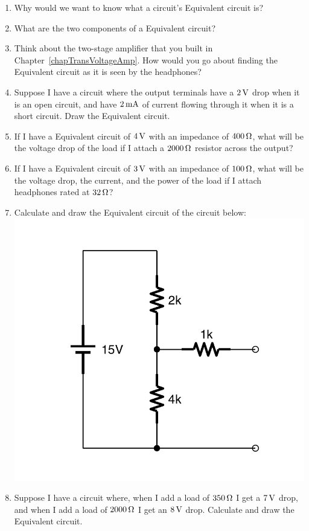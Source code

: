 \begin{enumerate}
\item Why would we want to know what a circuit's \thev Equivalent circuit is?
\item What are the two components of a \thev Equivalent circuit?
\item Think about the two-stage amplifier that you built in Chapter~\ref{chapTransVoltageAmp}.  How would you go about finding the \thev Equivalent circuit as it is seen by the headphones?
\item Suppose I have a circuit where the output terminals have a $2\,\si{\volt}$ drop when it is an open circuit, and have $2\,\si{\milli\ampere}$ of current flowing through it when it is a short circuit.  Draw the \thev Equivalent circuit.
\item If I have a \thev Equivalent circuit of $4\,\si{\volt}$ with an impedance of $400\,\si{\ohm}$, what will be the voltage drop of the load if I attach a $2000\,\si{\ohm}$ resistor across the output?
\item If I have a \thev Equivalent circuit of $3\,\si{\volt}$ with an impedance of $100\,\si{\ohm}$, what will be the voltage drop, the current, and the power of the load if I attach headphones rated at $32\,\si{\ohm}$?
\item Calculate and draw the \thev Equivalent circuit of the circuit below: 
\includegraphics[scale=0.25]{ThevProblem1.pdf}
\item Suppose I have a circuit where, when I add a load of $350\,\si{\ohm}$ I get a $7\,\si{\volt}$ drop, and when I add a load of $2000\,\si{\ohm}$ I get an $8\,\si{\volt}$ drop.  Calculate and draw the \thev Equivalent circuit.
\end{enumerate}
